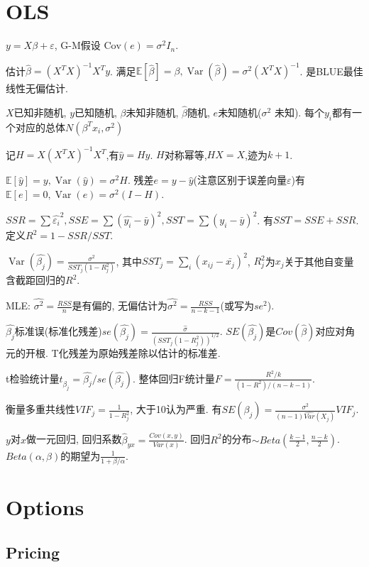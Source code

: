 \documentclass[UTF8]{ctexart}
\begin{document}
\section{OLS}
$y=X\beta+\varepsilon$, G-M假设 $\text{Cov}(e)=\sigma ^2 I_n$.

估计$\hat{\beta}=(X^TX)^{-1}X^Ty$.
满足$\mathbb{E}[\hat{\beta}]=\beta, \operatorname{Var}(\hat{\beta})=\sigma^2(X^TX)^{-1}$.
是BLUE最佳线性无偏估计.

$X$已知非随机, $y$已知随机, $\beta$未知非随机, $\hat{\beta}$随机, $e$未知随机($\sigma^2$ 未知).
每个$y_i$都有一个对应的总体$N(\beta^T x_i, \sigma^2)$

记$H=X(X^TX)^{-1}X^T$,有$\hat{y}=Hy$. $H$对称幂等,$HX=X$,迹为$k+1$.

$\mathbb{E}[\hat{y}]=y, \operatorname{Var}(\hat{y})=\sigma^2H$.
残差$e=y-\hat{y}$(注意区别于误差向量$\varepsilon$)有
$\mathbb{E}[e]=0, \operatorname{Var}(e)=\sigma^2 (I-H)$.

$SSR = \sum \hat{\varepsilon_i}^2, SSE = \sum (\hat{y_i}-\bar{y})^2, SST = \sum (y_i-\bar{y})^2$.
有$SST=SSE+SSR$.定义$R^2=1-SSR/SST$.

$\operatorname{Var}(\hat{\beta_j}) = \frac{\sigma^2}{SST_j(1-R_j^2)}$,
其中$SST_j=\sum_i (x_{ij}-\bar{x_j})^2$, $R_j^2$为$x_j$关于其他自变量含截距回归的$R^2$.

MLE: $\hat{\sigma^2}=\frac{RSS}{n}$是有偏的, 
无偏估计为$\hat{\sigma^2}=\frac{RSS}{n-k-1}$(或写为$se^2$).

$\hat{\beta_j}$标准误(标准化残差)$se(\hat{\beta_j}) = \frac{\hat{\sigma}}{(SST_j(1-R_j^2))^{1/2}}$.
$SE(\hat{\beta_j})$是$Cov(\hat{\beta})$对应对角元的开根.
T化残差为原始残差除以估计的标准差.


t检验统计量$t_{\hat{\beta_j}} = \hat{\beta_j}/se(\hat{\beta_j})$.
整体回归F统计量$F=\frac{R^2/k}{(1-R^2)/(n-k-1)}$.

衡量多重共线性$VIF_j = \frac{1}{1-R_j^2}$, 大于10认为严重.
有$SE(\beta_j)=\frac{\sigma^2}{(n-1)\hat{Var}(X_j)}VIF_j$.

$y$对$x$做一元回归, 回归系数$\hat{\beta}_{yx}=\frac{Cov(x,y)}{Var(x)}$. 回归$R^2$的分布$\sim Beta(\frac{k-1}{2},\frac{n-k}{2})$. $Beta(\alpha,\beta)$的期望为$\frac{1}{1+\beta/\alpha}$.


\section{Options}

\subsection{Pricing}
\end{document}
